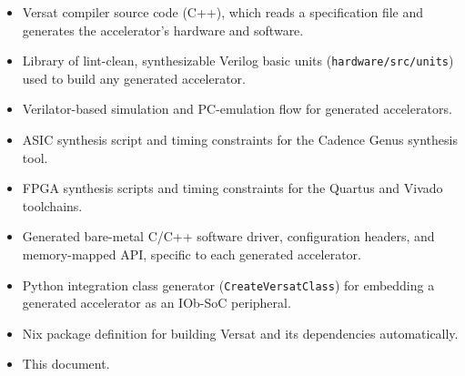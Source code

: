 %

\begin{itemize}
  \itemsep-0.5em
  \item Versat compiler source code (C++), which reads a specification
    file and generates the accelerator's hardware and software.
  \item Library of lint-clean, synthesizable Verilog basic units
    (\texttt{hardware/src/units}) used to build any generated accelerator.
  \item Verilator-based simulation and PC-emulation flow for generated
    accelerators.
  \item ASIC synthesis script and timing constraints for the Cadence Genus
    synthesis tool.
  \item FPGA synthesis scripts and timing constraints for the Quartus and
    Vivado toolchains.
  \item Generated bare-metal C/C++ software driver, configuration headers,
    and memory-mapped API, specific to each generated accelerator.
  \item Python integration class generator (\texttt{CreateVersatClass}) for
    embedding a generated accelerator as an IOb-SoC peripheral.
  \item Nix package definition for building Versat and its dependencies
    automatically.
  \item This document.
\end{itemize}
